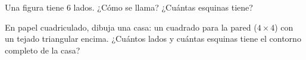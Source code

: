 \begin{exercise}[$\star$]\label{exo:g2:shapes:9}
Una figura tiene $6$ lados. ¿Cómo se llama? ¿Cuántas esquinas tiene?
\end{exercise}

\begin{exercise}[$\star\star$]\label{exo:g2:shapes:10}
En papel cuadriculado, dibuja una casa: un cuadrado para la pared
($4 \times 4$) con un tejado triangular encima. ¿Cuántos lados y cuántas
esquinas tiene el contorno completo de la casa?
\end{exercise}

